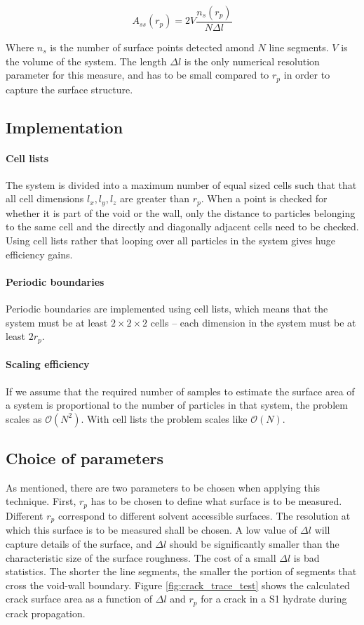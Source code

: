 \begin{equation}
A_{ss}(r_p) = 2V\frac{n_s(r_p)}{N\Delta l}
\end{equation}

Where $n_s$ is the number of surface points detected amond $N$ line segments. $V$ is the volume of the system. The length $\Delta l$ is the only numerical resolution parameter for this measure, and has to be small compared to $r_p$ in order to capture the surface structure. 

\subsection{Implementation}
\paragraph{Cell lists}
The system is divided into a maximum number of equal sized cells such that that all cell dimensions $l_x, l_y, l_z$ are greater than $r_p$. When a point is checked for whether it is part of the void or the wall, only the distance to particles belonging to the same cell and the directly and diagonally adjacent cells need to be checked. Using cell lists rather that looping over all particles in the system gives huge efficiency gains.
\paragraph{Periodic boundaries}
Periodic boundaries are implemented using cell lists, which means that the system must be at least $2\times 2 \times 2$ cells – each dimension in the system must be at least $2r_p$.
\paragraph{Scaling efficiency}
If we assume that the required number of samples to estimate the surface area of a system is proportional to the number of particles in that system, the problem scales as $\mathcal{O}(N^2)$. With cell lists the problem scales like $\mathcal{O}(N)$.

\subsection{Choice of parameters}
As mentioned, there are two parameters to be chosen when applying this technique. First, $r_p$ has to be chosen to define what surface is to be measured. Different $r_p$ correspond to different solvent accessible surfaces. The resolution at which this surface is to be measured shall be chosen. A low value of $\Delta l$ will capture details of the surface, and $\Delta l$ should be significantly smaller than the characteristic size of the surface roughness. The cost of a small $\Delta l$ is bad statistics. The shorter the line segments, the smaller the portion of segments that cross the void-wall boundary. Figure \ref{fig:crack_trace_test} shows the calculated crack surface area as a function of $\Delta l$ and $r_p$ for a crack in a S1 hydrate during crack propagation. 

